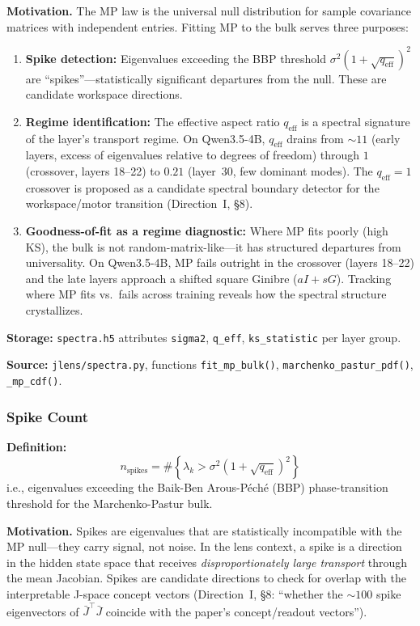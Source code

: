 \documentclass[11pt,a4paper]{article}
\begin{document}
\textbf{Motivation.} The MP law is the universal null distribution for sample covariance matrices with independent entries. Fitting MP to the bulk serves three purposes:
\begin{enumerate}
  \item \textbf{Spike detection:} Eigenvalues exceeding the BBP threshold $\sigma^2(1 + \sqrt{q_{\text{eff}}})^2$ are ``spikes''---statistically significant departures from the null. These are candidate workspace directions.
  \item \textbf{Regime identification:} The effective aspect ratio $q_{\text{eff}}$ is a spectral signature of the layer's transport regime. On Qwen3.5-4B, $q_{\text{eff}}$ drains from $\sim 11$ (early layers, excess of eigenvalues relative to degrees of freedom) through $1$ (crossover, layers 18--22) to $0.21$ (layer~30, few dominant modes). The $q_{\text{eff}} = 1$ crossover is proposed as a candidate spectral boundary detector for the workspace/motor transition (Direction~I, \S8).
  \item \textbf{Goodness-of-fit as a regime diagnostic:} Where MP fits poorly (high KS), the bulk is not random-matrix-like---it has structured departures from universality. On Qwen3.5-4B, MP fails outright in the crossover (layers 18--22) and the late layers approach a shifted square Ginibre ($aI + sG$). Tracking where MP fits vs.\ fails across training reveals how the spectral structure crystallizes.
\end{enumerate}

\textbf{Storage:} \texttt{spectra.h5} attributes \texttt{sigma2}, \texttt{q\_eff}, \texttt{ks\_statistic} per layer group.

\textbf{Source:} \texttt{jlens/spectra.py}, functions \texttt{fit\_mp\_bulk()}, \texttt{marchenko\_pastur\_pdf()}, \texttt{\_mp\_cdf()}.

\subsubsection{Spike Count}
\label{sec:spikes}

\textbf{Definition:} 
\begin{equation}
  n_{\text{spikes}} = \#\left\{\lambda_k > \sigma^2\left(1 + \sqrt{q_{\text{eff}}}\right)^2\right\}
\end{equation}
i.e., eigenvalues exceeding the Baik-Ben Arous-Péché (BBP) phase-transition threshold for the Marchenko-Pastur bulk.

\textbf{Motivation.} Spikes are eigenvalues that are statistically incompatible with the MP null---they carry signal, not noise. In the lens context, a spike is a direction in the hidden state space that receives \emph{disproportionately large transport} through the mean Jacobian. Spikes are candidate directions to check for overlap with the interpretable J-space concept vectors (Direction~I, \S8: ``whether the $\sim 100$ spike eigenvectors of $\bar{J}^\top \bar{J}$ coincide with the paper's concept/readout vectors'').
\end{document}
